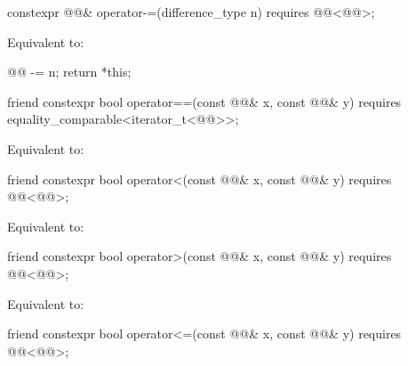 %
\begin{itemdecl}
constexpr @@& operator-=(difference_type n)
  requires @@<@@>;
\end{itemdecl}

\begin{itemdescr}
\pnum
\effects
Equivalent to:
\begin{codeblock}
@@ -= n;
return *this;
\end{codeblock}
\end{itemdescr}

%
\begin{itemdecl}
friend constexpr bool operator==(const @@& x, const @@& y)
  requires equality_comparable<iterator_t<@@>>;
\end{itemdecl}

\begin{itemdescr}
\pnum
\effects
Equivalent to: 
\end{itemdescr}

%
\begin{itemdecl}
friend constexpr bool operator<(const @@& x, const @@& y)
  requires @@<@@>;
\end{itemdecl}

\begin{itemdescr}
\pnum
\effects
Equivalent to: 
\end{itemdescr}

%
\begin{itemdecl}
friend constexpr bool operator>(const @@& x, const @@& y)
  requires @@<@@>;
\end{itemdecl}

\begin{itemdescr}
\pnum
\effects
Equivalent to: 
\end{itemdescr}

%
\begin{itemdecl}
friend constexpr bool operator<=(const @@& x, const @@& y)
  requires @@<@@>;
\end{itemdecl}

